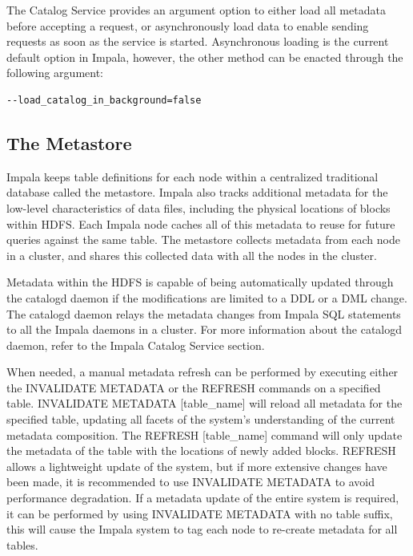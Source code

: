 \documentclass[onecolumn, draftclsnofoot,10pt, compsoc]{IEEEtran}
\begin{document}
The Catalog Service provides an argument option to either load all metadata before accepting a request, or asynchronously load data to enable sending requests as soon as the service is started.
Asynchronous loading is the current default option in Impala, however, the other method can be enacted through the following argument:
    \begin{center}
\begin{lstlisting}[language=bash]
--load_catalog_in_background=false
\end{lstlisting}
\end{center}

\subsection{The Metastore}
Impala keeps table definitions for each node within a centralized traditional database called the metastore. 
Impala also tracks additional metadata for the low-level characteristics of data files, including the physical locations of blocks within HDFS. 
Each Impala node caches all of this metadata to reuse for future queries against the same table. 
The metastore collects metadata from each node in a cluster, and shares this collected data with all the nodes in the cluster.

Metadata within the HDFS is capable of being automatically updated through the catalogd daemon if the modifications are limited to a DDL or a DML change. 
The catalogd daemon relays the metadata changes from Impala SQL statements to all the Impala daemons in a cluster. 
For more information about the catalogd daemon, refer to the Impala Catalog Service section. 
 
When needed, a manual metadata refresh can be performed by executing either the INVALIDATE METADATA or the REFRESH commands on a specified table. 
INVALIDATE METADATA [table\_name] will reload all metadata for the specified table, updating all facets of the system’s understanding of the current metadata composition.
The REFRESH [table\_name] command will only update the metadata of the table with the locations of newly added blocks.
REFRESH allows a lightweight update of the system, but if more extensive changes have been made, it is recommended to use INVALIDATE METADATA to avoid performance degradation.
If a metadata update of the entire system is required, it can be performed by using INVALIDATE METADATA with no table suffix, this will cause the Impala system to tag each node to re-create metadata for all tables.
    
\end{document}

